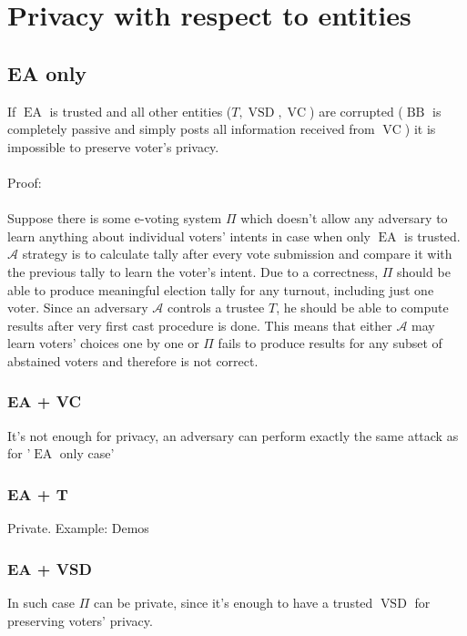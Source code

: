\documentclass[12pt]{article}
\DeclareMathOperator{\vsd}{VSD}
\DeclareMathOperator{\ea}{EA}
\DeclareMathOperator{\bb}{BB}
\DeclareMathOperator{\voc}{VC}
\begin{document}
%
%
\section{Privacy with respect to entities}
\subsection{EA only}
If $\ea$ is trusted and all other entities ($T,\vsd,\voc$) are corrupted ($\bb$ is completely passive and simply posts all information received from $\voc$) it is impossible to preserve voter's privacy. \\\\
Proof:\\\\
Suppose there is some e-voting system $\Pi$ which doesn't allow any adversary to learn anything about individual voters' intents in case when only $\ea$ is trusted. $\mathcal{A}$ strategy is to calculate tally after every vote submission and compare it with the previous tally to learn the voter's intent. Due to a correctness, $\Pi$ should be able to produce meaningful election tally for any turnout, including just one voter. Since an adversary $\mathcal{A}$ controls a trustee $T$, he should be able to compute results after very first cast procedure is done. This means that either $\mathcal{A}$  may learn voters' choices one by one or $\Pi$ fails to produce results for any subset of abstained voters  and therefore is not correct. 
\subsubsection{EA + VC}
 It's not enough for privacy, an adversary can perform exactly the same attack as for '$\ea$ only case'
\subsubsection{EA + T}
Private. Example: Demos 
\subsubsection{EA + VSD}
 In such case $\Pi$ can be private, since it's enough to have a trusted $\vsd$ for preserving voters' privacy.
\end{document}
